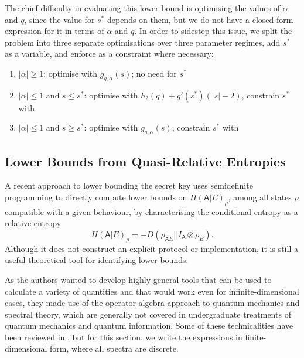 \documentclass[10pt, a4paper]{article}
\numberwithin{equation}{section} %
\theoremstyle{definition}
\theoremstyle{plain}
\newcommand{\abs}[1]{\left\lvert#1\right\rvert}
\newcommand{\?}{\mathrel{?}} %
\newcommand{\crv}[1]{\mathsf{#1}}
\begin{document}
    The chief difficulty in evaluating this lower bound is optimising the values of \(\alpha\) and \(q\), since the value for \(s^*\) depends on them, but we do not have a closed form expression for it in terms of \(\alpha\) and \(q\). In order to sidestep this issue, we split the problem into three separate optimisations over three parameter regimes, add \(s^*\) as a variable, and enforce  as a constraint where necessary:
    \begin{enumerate}
      \item \(\abs{\alpha} \geq 1\): optimise with \(g_{q,\alpha}(s)\); no need for \(s^*\)
      \item \(\abs{\alpha} \leq 1\) and \(s \leq s^*\): optimise with \(h_2(q) + g'(s^*)(\abs{s}-2)\), constrain \(s^*\) with 
      \item \(\abs{\alpha} \leq 1\) and \(s \geq s^*\): optimise with \(g_{q,\alpha}(s)\), constrain \(s^*\) with 
    \end{enumerate}

    \subsection{Lower Bounds from Quasi-Relative Entropies}\label{sec:diqkd_qre}

    A recent approach to lower bounding the secret key uses semidefinite programming to directly compute lower bounds on \(H{(\crv{A}|E)}_{\rho}\), among all states \(\rho\) compatible with a given behaviour, by characterising the conditional entropy as a relative entropy
    \begin{equation}
      H{(\crv{A}|E)}_{\rho} = -D(\rho_{\crv{A}E}||I_\crv{A} \otimes \rho_{E}).
    \end{equation}
    Although it does not construct an explicit protocol or implementation, it is still a useful theoretical tool for identifying lower bounds.

    As the authors wanted to develop highly general tools that can be used to calculate a variety of quantities and that would work even for infinite-dimensional cases, they made use of the operator algebra approach to quantum mechanics and spectral theory, which are generally not covered in undergraduate treatments of quantum mechanics and quantum information. Some of these technicalities have been reviewed in , but for this section, we write the expressions in finite-dimensional form, where all spectra are discrete.
\end{document}
